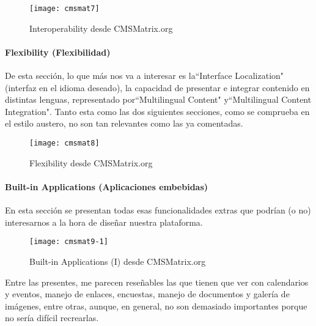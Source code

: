 \begin{figure}
\begin{narrow}{-0.15\linewidth}{-0.15\linewidth}
\centering
\texttt{[image: cmsmat7]}
\caption{Interoperability desde CMSMatrix.org}
\end{narrow}
\label{fig:cmsmat7}
\end{figure}



\paragraph{Flexibility (Flexibilidad)}


\par De esta sección, lo que más nos va a interesar es la``Interface Localization" (interfaz en el idioma deseado), la capacidad de presentar e integrar contenido en distintas lenguas, representado por``Multilingual Content" y``Multilingual Content Integration". Tanto esta como las dos siguientes secciones, como se comprueba en el estilo austero, no son tan relevantes como las ya comentadas.

\begin{figure}
\begin{narrow}{-0.15\linewidth}{-0.15\linewidth}
\centering
\texttt{[image: cmsmat8]}
\caption{Flexibility desde CMSMatrix.org}
\end{narrow}
\label{fig:cmsmat8}
\end{figure}


\paragraph{Built-in Applications (Aplicaciones embebidas)}


\par En esta sección se presentan todas esas funcionalidades extras que podrían (o no) interesarnos a la hora de diseñar nuestra plataforma. 

\begin{figure}
\begin{narrow}{-0.15\linewidth}{-0.15\linewidth}
\centering
\texttt{[image: cmsmat9-1]}
\caption{Built-in Applications (I) desde CMSMatrix.org}
\end{narrow}
\label{fig:cmsmat9}
\end{figure}

\par Entre las presentes, me parecen reseñables las que tienen que ver con calendarios y eventos, manejo de enlaces, encuestas, manejo de documentos y galería de imágenes, entre otras, aunque, en general, no son demasiado importantes porque no sería difícil recrearlas.

